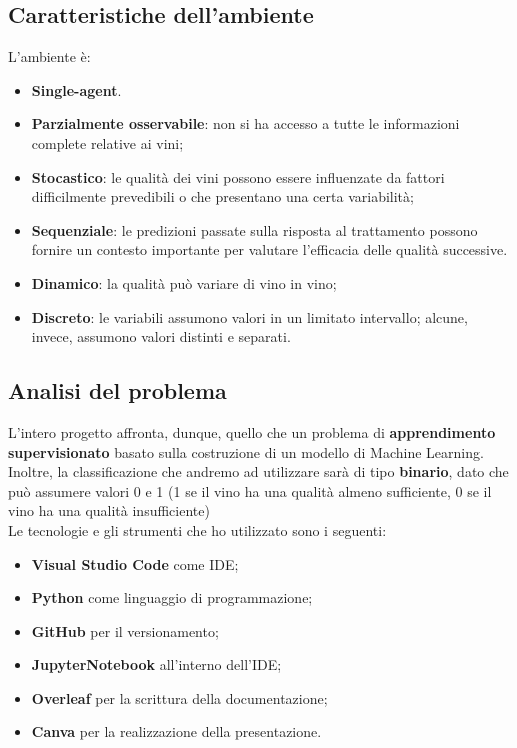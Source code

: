 \documentclass{article}
\begin{document}
\begin{titlepage}
        \subsection{Caratteristiche dell'ambiente}
        L'ambiente è:
        \begin{itemize}
            \item \textbf{Single-agent}.
            \item \textbf{Parzialmente osservabile}: non si ha accesso a tutte le informazioni complete relative ai vini;
            \item \textbf{Stocastico}: le qualità dei vini possono essere influenzate da fattori  difficilmente prevedibili o che presentano una certa variabilità;
            \item \textbf{Sequenziale}:  le predizioni passate sulla risposta al trattamento possono
            fornire un contesto importante per valutare l’efficacia delle qualità successive.
            \item \textbf{Dinamico}: la qualità può variare di vino in vino;
            \item \textbf{Discreto}: le variabili assumono valori in un limitato intervallo; alcune, invece, assumono valori distinti e separati.
        \end{itemize}

        \subsection{Analisi del problema}
        L'intero progetto affronta, dunque, quello che un problema di \textbf{apprendimento supervisionato} basato sulla costruzione di un modello di Machine Learning. 
        Inoltre, la classificazione che andremo ad utilizzare sarà di tipo \textbf{binario}, dato che può assumere valori 0 e 1 (1 se il vino ha una qualità almeno sufficiente, 0 se il vino ha una qualità insufficiente) \\
        Le tecnologie e gli strumenti che ho utilizzato sono i seguenti:
        \begin{itemize}
            \item \textbf{Visual Studio Code} come IDE;
            \item \textbf{Python} come linguaggio di programmazione;
            \item \textbf{GitHub} per il versionamento;
            \item \textbf{JupyterNotebook} all’interno dell’IDE;
            \item \textbf{Overleaf} per la scrittura della documentazione;
            \item \textbf{Canva} per la realizzazione della presentazione.
        \end{itemize}


\end{titlepage}
\end{document}
